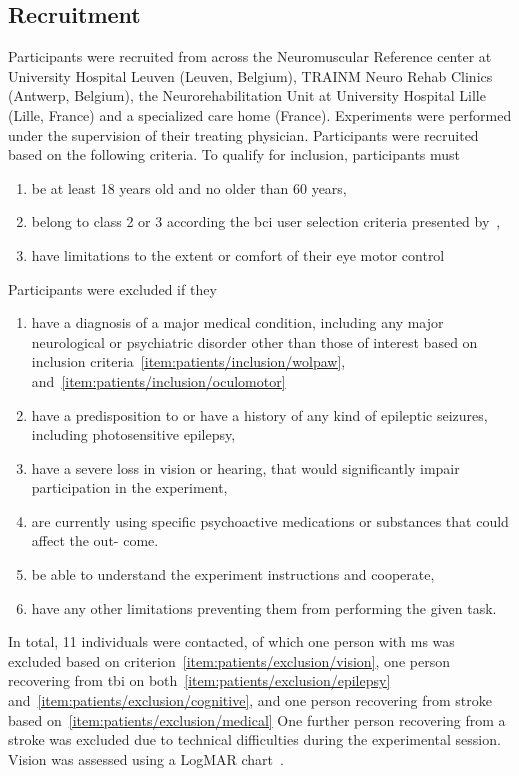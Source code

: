 \subsection{Recruitment}
Participants were recruited from across the Neuromuscular Reference center at
University Hospital Leuven (Leuven, Belgium), TRAINM Neuro Rehab Clinics
(Antwerp, Belgium), the Neurorehabilitation Unit at University Hospital Lille
(Lille, France) and a specialized care home (France).
Experiments were performed under the supervision of their treating physician.
Participants were recruited based on the following criteria.
To qualify for inclusion, participants must
\begin{enumerate}
	\item be at least 18 years old and no older than 60
	years,
  \item belong to class 2 or 3 according the \ac{bci}	user selection criteria
    presented by~\textcite{Wolpaw2006},\label{item:patients/inclusion/wolpaw}
  \item have limitations to the extent or comfort of their eye motor control\label{item:patients/inclusion/oculomotor}
\end{enumerate}
Participants were excluded if they
\begin{enumerate}
  \item have a diagnosis of a major medical condition, including any major
    neurological or psychiatric disorder other than those of interest based on
    inclusion criteria~\ref{item:patients/inclusion/wolpaw},
    and~\ref{item:patients/inclusion/oculomotor}\label{item:patients/exclusion/medical}
  \item have a predisposition to or have a history of any kind of epileptic seizures,
    including photosensitive epilepsy,\label{item:patients/exclusion/epilepsy}
  \item have a severe loss in vision or hearing, that would significantly impair
        participation in the experiment,\label{item:patients/exclusion/vision}
  \item are currently using specific psychoactive medications or substances that could affect the out-
        come.\label{item:patients/exclusion/cognitive}
  \item be able to understand the experiment instructions and cooperate,
  \item have any other limitations preventing them from performing the given task.
\end{enumerate}

In total, 11 individuals were contacted, of which one person with \ac{ms} was excluded based on
criterion~\ref{item:patients/exclusion/vision}, one person recovering from
\ac{tbi} on
both~\ref{item:patients/exclusion/epilepsy}
and~\ref{item:patients/exclusion/cognitive}, and one person recovering from
stroke based
on~\ref{item:patients/exclusion/medical}
One further person recovering from a stroke was excluded due to technical
difficulties during the experimental session.
Vision was assessed using a LogMAR chart~\cite{Bailey1976}.

